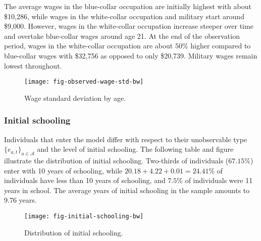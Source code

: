 The average wages in the blue-collar occupation are initially highest with about \$10,286, while wages in the white-collar occupation and military start around \$9,000. However, wages in the white-collar occupation increase steeper over time and overtake blue-collar wages around age 21. At the end of the observation period, wages in the white-collar occupation are about $50\%$ higher compared to blue-collar wages with \$32,756 as opposed to only \$20,739. Military wages remain lowest throughout.
\newpage

\begin{figure}[h]\centering
\caption{Wage standard deviation by age.}\label{fig:WageMoments}
\texttt{[image: fig-observed-wage-std-bw]}
\end{figure}

\subsubsection*{Initial schooling}

Individuals that enter the model differ with respect to their unobservable type $\{e_{a,t}\}_{a \in \mathcal{A}}$ and the level of initial schooling. The following table and figure illustrate the distribution of initial schooling. Two-thirds of individuals ($67.15\%$) enter with 10 years of schooling, while $20.18 + 4.22 + 0.01 = 24.41\%$ of individuals have less than 10 years of schooling, and $7.5\%$ of individuals were 11 years in school. The average years of initial schooling in the sample amounts to 9.76 years.

\begin{figure}[h]\centering
\caption{Distribution of initial schooling.}\label{fig:InitialSchooling}
\texttt{[image: fig-initial-schooling-bw]}
\end{figure}

